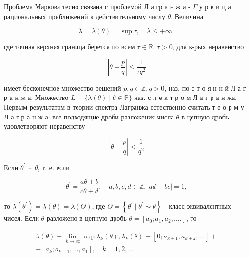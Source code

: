 \documentclass[10pt]{article}
\begin{document}
Проблема Маркова тесно связана с проблемой Л а гр а н ж а - $\Gamma$ у р в и ц а рациональных приближений к действительному числу $\theta$. Величина



\[

\lambda=\lambda(\theta)=\sup \tau, \quad \lambda \leqslant+\infty,

\]



где точная верхняя граница берется по всем $\tau \in \mathbb{R}$, $\tau>0$, для к-рых неравенство



\[

\left|\theta-\frac{p}{q}\right| \leqslant \frac{1}{\tau q^{2}}

\]



имеет бесконечное множество решений $p, q \in \mathbb{Z}, q>0$, наз. по с т о я н н й Л а г р а н ж а. Множество $L=\{\lambda(\theta) \mid \theta \in \mathbb{R}\}$ наз. с п е к т р о м Л а г р а н жа. Первым ревультатом в теории спектра Лагранжа естественно считать т е о р м у Л а г р а н ж а: все подходящие дроби разложения числа $\theta$ в цепную дробъ удовлетворяют неравенству



\[

\left|\theta-\frac{p}{q}\right|<\frac{1}{q^{2}}

\]



Если $\theta^{\prime} \sim \theta$, т. е. если



\[

\theta^{\prime}=\frac{a \theta+b}{c \theta+d}, \quad a, b, c, d \in \mathbb{Z},|a d-b c|=1,

\]



то $\lambda\left(\theta^{\prime}\right)=\lambda(\theta)=\lambda(\Theta)$, где $\Theta=\left\{\theta^{\prime} \mid \theta^{\prime} \sim \theta\right\}$ - класс эквивалентных чисел. Если $\theta$ разложено в цепную дробь $\theta=\left[a_{0} ; a_{1}, a_{2}, \ldots.\right]$, то



\[

\begin{gathered}

\lambda(\theta)=\lim _{k \rightarrow \infty} \sup \lambda_{k}(\theta), \lambda_{k}(\theta)=\left[0 ; a_{k+1}, a_{k+2}, \ldots\right]+ \\

+\left[a_{k} ; a_{k-1}, \ldots, a_{1}\right], \quad k=1,2, \ldots

\end{gathered}

\]
\end{document}

